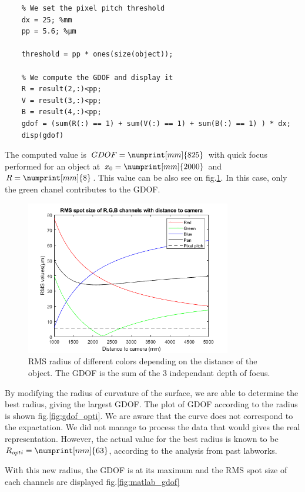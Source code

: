 \documentclass[10pt,letterpaper]{article}
\begin{document}
\begin{verbatim}
    % We set the pixel pitch threshold
    dx = 25; %mm
    pp = 5.6; %µm
    
    threshold = pp * ones(size(object));

    % We compute the GDOF and display it
    R = result(2,:)<pp;
    V = result(3,:)<pp;
    B = result(4,:)<pp;
    gdof = (sum(R(:) == 1) + sum(V(:) == 1) + sum(B(:) == 1) ) * dx;
    disp(gdof)
\end{verbatim}

The computed value is $GDOF = \numprint[mm]{825}$ with quick focus performed for an object at $x_0 = \numprint[mm]{2000}$ and $R= \numprint[mm]{8}$. This value can be also see on fig.\ref{fig:gdof_init}. In this case, only the green chanel contributes to the GDOF.

\begin{figure}[h]
    \centering
    \includegraphics[width=0.8\textwidth]{IO25_TP4_GDOF_init_2000_R8.png}
    \caption{RMS radius of different colors depending on the distance of the object. The GDOF is the sum of the 3 independant depth of focus.}
    \label{fig:gdof_init}
\end{figure}

By modifying the radius of curvature of the surface, we are able to determine the best radius, giving the largest GDOF. The plot of GDOF according to the radius is shown fig.\ref{fig:gdof_opti}. We are aware that the curve does not correspond to the expactation. We did not manage to process the data that would gives the real representation. However, the actual value for the best radius is known to be $R_{opti}=\numprint[mm]{63}$, according to the analysis from past labworks.

With this new radius, the GDOF is at its maximum and the RMS spot size of each channels are displayed fig.\ref{fig:matlab_gdof}
\end{document}
